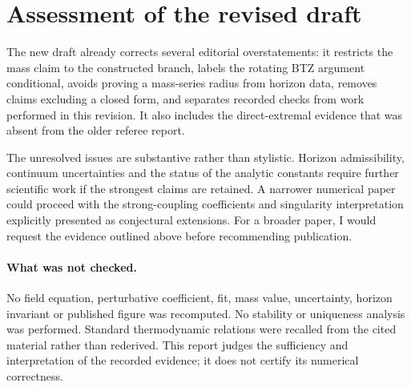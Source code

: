 \documentclass[11pt,a4paper]{article}
\begin{document}
\section*{Assessment of the revised draft}
The new draft already corrects several editorial overstatements: it restricts the mass claim to the constructed branch, labels the rotating BTZ argument conditional, avoids proving a mass-series radius from horizon data, removes claims excluding a closed form, and separates recorded checks from work performed in this revision. It also includes the direct-extremal evidence that was absent from the older referee report.

The unresolved issues are substantive rather than stylistic. Horizon admissibility, continuum uncertainties and the status of the analytic constants require further scientific work if the strongest claims are retained. A narrower numerical paper could proceed with the strong-coupling coefficients and singularity interpretation explicitly presented as conjectural extensions. For a broader paper, I would request the evidence outlined above before recommending publication.

\paragraph{What was not checked.}
No field equation, perturbative coefficient, fit, mass value, uncertainty, horizon invariant or published figure was recomputed. No stability or uniqueness analysis was performed. Standard thermodynamic relations were recalled from the cited material rather than rederived. This report judges the sufficiency and interpretation of the recorded evidence; it does not certify its numerical correctness.
\end{document}
